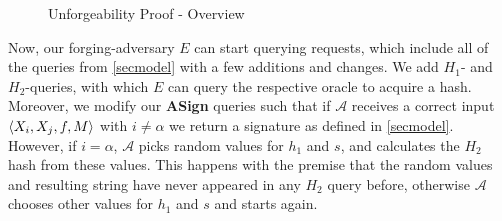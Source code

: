 \begin{figure}[htbp]

  \begin{center}
  \end{center}

  \caption{Unforgeability Proof - Overview}
  \label{fig:proofoverview}
\end{figure}

Now, our forging-adversary \(E\) can start querying requests, which include all of the queries from \autoref{secmodel} with a few additions and changes.
We add \(H_1\)- and \(H_2\)-queries, with which \(E\) can query the respective oracle to acquire a hash. 
Moreover, we modify our \textbf{ASign} queries such that if \(\mathcal{A}\) receives a correct input \(\langle X_i, X_j, f, M \rangle\) with \(i\neq\alpha\) we return a signature as defined in \autoref{secmodel}.
However, if \(i = \alpha\), \(\mathcal{A}\) picks random values for \(h_1\) and \(s\), and calculates the \(H_2\) hash from these values.
This happens with the premise that the random values and resulting string have never appeared in any \(H_2\) query before, otherwise \(\mathcal{A}\) chooses other values for \(h_1\) and \(s\) and starts again.

